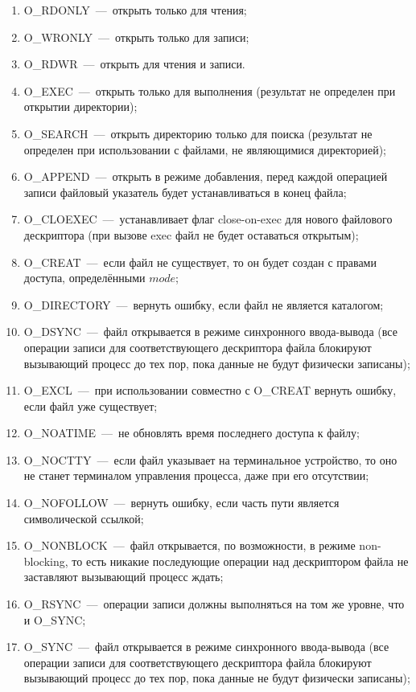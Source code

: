 \begin{enumerate}
	\item O\_RDONLY~---~открыть только для чтения;
	\item O\_WRONLY~---~открыть только для записи;
	\item O\_RDWR~---~открыть для чтения и записи.
	\item O\_EXEC~---~открыть только для выполнения (результат не определен при открытии директории);
	\item O\_SEARCH~---~открыть директорию только для поиска (результат не определен при использовании с файлами, не являющимися директорией);
	\item O\_APPEND~---~открыть в режиме добавления, перед каждой операцией записи файловый указатель будет устанавливаться в конец файла;
	\item O\_CLOEXEC~---~устанавливает флаг close-on-exec для нового файлового дескриптора (при вызове exec файл не будет оставаться открытым);
	\item O\_CREAT~---~если файл не существует, то он будет создан с правами доступа, определёнными $mode$;
	\item O\_DIRECTORY~---~вернуть ошибку, если файл не является каталогом;
	\item O\_DSYNC~---~файл открывается в режиме синхронного ввода-вывода (все операции записи для соответствующего дескриптора файла блокируют вызывающий процесс до тех пор, пока данные не будут физически записаны);
	\item O\_EXCL~---~при использовании совместно с O\_CREAT вернуть ошибку, если файл уже существует;
	\item O\_NOATIME~---~не обновлять время последнего доступа к файлу;
	\item O\_NOCTTY~---~если файл указывает на терминальное устройство, то оно не станет терминалом управления процесса, даже при его отсутствии;
	\item O\_NOFOLLOW~---~вернуть ошибку, если часть пути является символической ссылкой;
	\item O\_NONBLOCK~---~файл открывается, по возможности, в режиме non-blocking, то есть никакие последующие операции над дескриптором файла не заставляют вызывающий процесс ждать;
	\item O\_RSYNC~---~операции записи должны выполняться на том же уровне, что и O\_SYNC;
	\item O\_SYNC~---~файл открывается в режиме синхронного ввода-вывода (все операции записи для соответствующего дескриптора файла блокируют вызывающий процесс до тех пор, пока данные не будут физически записаны);

\end{enumerate}
